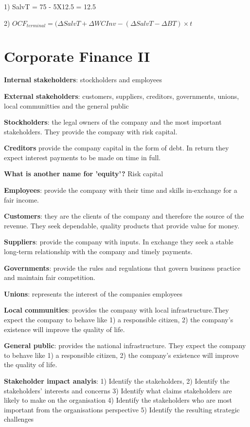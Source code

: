 \documentclass[12pt]{article}
\begin{document}
\begin{framed}
{			1) SalvT = 75 - 5X12.5 = 12.5
			
			2)  $OCF_{terminal} = (\Delta SalvT +  \Delta WCInv -(\Delta SalvT - \Delta BT) \times t$
			
			\newpage
			
			\section{Corporate Finance II}
			
			\textbf{Internal stakeholders}: stockholders and employees
			
			\textbf{External stakeholders}: customers, suppliers, creditors, governments, unions, local communitties and the general public
			
			\textbf{Stockholders}: the legal owners of the company and the most important stakeholders. They provide the company with risk capital.
			
			\textbf{Creditors} provide the company capital in the form of debt. In return they expect interest payments to be made on time in full. 
			
			\textbf{What is another name for 'equity'?} Risk capital
			
			\textbf{Employees}: provide the company with their time and skills in-exchange for a fair income.
			
			\textbf{Customers}: they are the clients of the company and therefore the source of the revenue. They seek dependable, quality products that provide value for money. 
		
			\textbf{Suppliers}: provide the company with inputs. In exchange they seek a stable long-term relationship with the company and timely payments. 
			
			\textbf{Governments}: provide the rules and regulations that govern business practice and maintain fair competition.	
			
			\textbf{Unions}: represents the interest of the companies employees
			
			\textbf{Local communities}: provides the company with local infrastructure.They expect the company to behave like 1) a responsible citizen, 2) the company's existence will improve the quality of life. 
			
			\textbf{General public}: provides the national infrastructure. They expect the company to behave like 1) a responsible citizen, 2) the company's existence will improve the quality of life. 
			
			\textbf{Stakeholder impact analyis}: 
			1) Identify the stakeholders,
			2) Identify the stakeholders' interests and concerns
			3) Identify what claims stakeholders are likely to make on the organisation
			4) Identify the stakeholders who are most important from the organisations perspective
			5) Identify the resulting strategic challenges
			
}
\end{framed}
\end{document}
